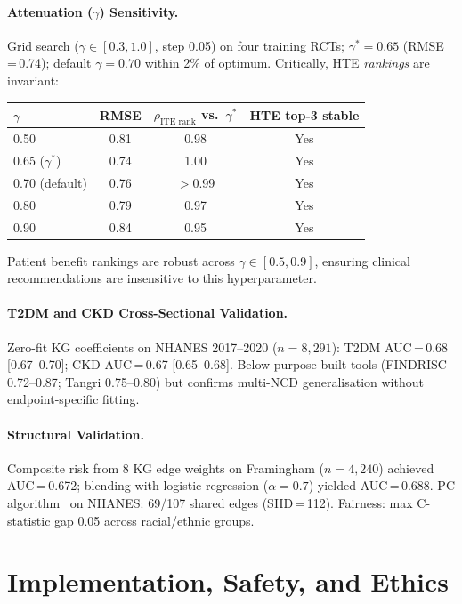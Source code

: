 \documentclass[runningheads]{llncs}
\begin{document}
\paragraph{Attenuation ($\gamma$) Sensitivity.}
Grid search ($\gamma \in [0.3, 1.0]$, step 0.05) on four training
RCTs; $\gamma^*=0.65$ (RMSE\,=\,0.74); default $\gamma=0.70$
within 2\% of optimum.
Critically, HTE \emph{rankings} are invariant:

\smallskip
\noindent
\begin{small}
\begin{tabular}{@{}lccc@{}}
\toprule
$\gamma$ & RMSE & $\rho_{\text{ITE rank}}$ vs.\ $\gamma^*$ & HTE top-3 stable \\
\midrule
0.50 & 0.81 & 0.98 & Yes \\
0.65 ($\gamma^*$) & 0.74 & 1.00 & Yes \\
0.70 (default) & 0.76 & $>$0.99 & Yes \\
0.80 & 0.79 & 0.97 & Yes \\
0.90 & 0.84 & 0.95 & Yes \\
\bottomrule
\end{tabular}
\end{small}
\smallskip

\noindent Patient benefit rankings are robust across
$\gamma \in [0.5, 0.9]$, ensuring clinical recommendations are
insensitive to this hyperparameter.

\paragraph{T2DM and CKD Cross-Sectional Validation.}
Zero-fit KG coefficients on NHANES 2017--2020 ($n = 8{,}291$):
T2DM AUC\,=\,0.68 [0.67--0.70]; CKD AUC\,=\,0.67 [0.65--0.68].
Below purpose-built tools (FINDRISC 0.72--0.87; Tangri 0.75--0.80)
but confirms multi-NCD generalisation without endpoint-specific
fitting.

\paragraph{Structural Validation.}
Composite risk from 8 KG edge weights on Framingham ($n = 4{,}240$)
achieved AUC\,=\,0.672; blending with logistic regression
($\alpha\!=\!0.7$) yielded AUC\,=\,0.688.
PC algorithm~\cite{spirtes2000causation} on NHANES: 69/107 shared
edges (SHD\,=\,112).
Fairness: max C-statistic gap 0.05 across racial/ethnic groups.

\section{Implementation, Safety, and Ethics}\label{sec:impl}
\end{document}
